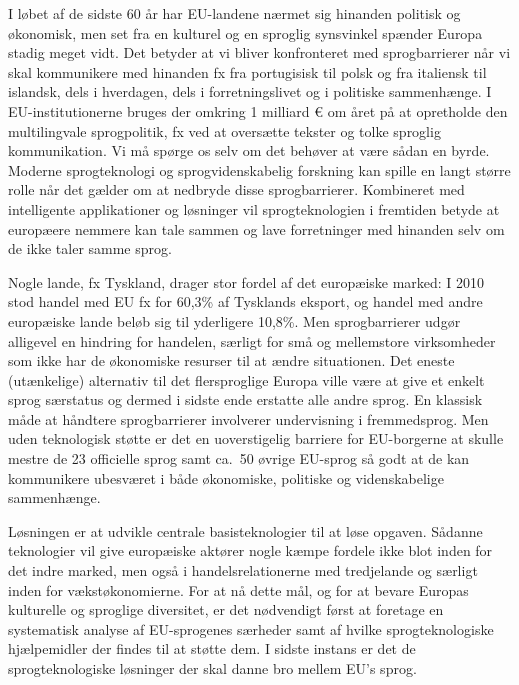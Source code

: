 \documentclass[]{../../metanetpaper}
\begin{document}
\begin{multicols}{2}
 

 I l\o bet af de sidste 60 \mbox{\aa}r har EU-landene n\ae rmet sig hinanden politisk og \o konomisk, men set fra en kulturel og en sproglig synsvinkel sp\ae nder Europa stadig meget vidt.
Det betyder at vi bliver konfronteret med sprogbarrierer \mbox{n\aa r} vi skal kommunikere med hinanden fx fra portugisisk til polsk og fra italiensk til islandsk, dels i hverdagen, dels i forretningslivet og i politiske sammenh\ae nge. I EU-institutionerne bruges der omkring 1 milliard € om \aa ret \mbox{p\aa} at opretholde den multilingvale sprogpolitik, fx ved at overs\ae tte tekster og tolke sproglig kommunikation. Vi \mbox{m\aa} sp\o rge os selv om det beh\o ver at v\ae re s\aa dan en byrde. Moderne sprogteknologi og sprogvidenskabelig forskning kan spille en langt st\o rre rolle n\aa r det g\ae lder om at nedbryde disse sprogbarrierer. Kombineret med intelligente applikationer og l\o sninger vil sprogteknologien i fremtiden betyde at europ\ae ere nemmere kan tale sammen og lave forretninger med hinanden selv om de ikke taler samme sprog.


Nogle lande, fx Tyskland, drager stor fordel af det europ\ae iske marked: I 2010 stod handel med EU fx for 60,3\% af Tysklands eksport, og handel med andre europ\ae iske lande bel\o b sig til yderligere 10,8\%. Men sprogbarrierer udg\o r alligevel en hindring for handelen, s\ae rligt for \mbox{sm\aa} og mellemstore virksomheder som ikke har de \o konomiske resurser til at \ae ndre situationen. Det eneste (ut\ae nkelige) alternativ til det flersproglige Europa ville v\ae re at give et enkelt sprog s\ae rstatus og dermed i sidste ende erstatte alle andre sprog. En klassisk m\aa de at h\aa ndtere sprogbarrierer involverer undervisning i fremmedsprog. Men uden teknologisk st\o tte er det en uoverstigelig barriere for EU-borgerne at skulle mestre de 23 officielle sprog samt ca.\ 50 \o vrige EU-sprog \mbox{s\aa} godt at de kan kommunikere ubesv\ae ret i b\aa de \o konomiske, politiske og videnskabelige sammenh\ae nge. 

L\o sningen er at udvikle centrale basisteknologier til at l\o se opgaven. S\aa danne teknologier vil give europ\ae iske akt\o rer nogle k\ae mpe fordele ikke blot inden for det indre marked, men \mbox{ogs\aa} i handelsrelationerne med tredjelande og s\ae rligt inden for v\ae kst\o konomierne. For at \mbox{n\aa} dette m\aa l, og for at bevare Europas kulturelle og sproglige diversitet, er det n\o dvendigt f\o rst at foretage en systematisk analyse af EU-sprogenes s\ae rheder samt af hvilke sprogteknologiske hj\ae lpemidler der findes til at st\o tte dem. I sidste instans er det de sprogteknologiske l\o sninger der skal danne bro mellem EU's sprog.



\end{multicols}
\end{document}
